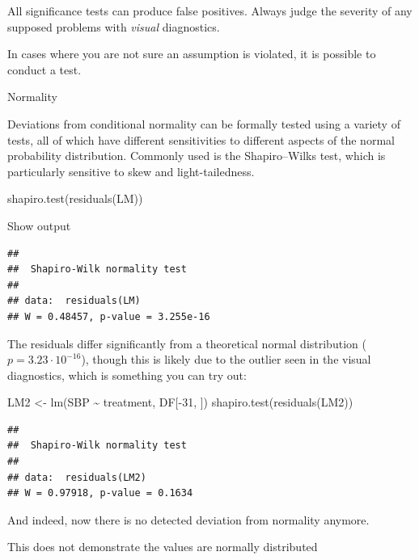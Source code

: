 \documentclass[
]{book}
\newenvironment{Shaded}{\begin{snugshade}}{\end{snugshade}}
\newcommand{\DecValTok}[1]{\textcolor[rgb]{0.00,0.00,0.81}{#1}}
\newcommand{\FunctionTok}[1]{\textcolor[rgb]{0.00,0.00,0.00}{#1}}
\newcommand{\NormalTok}[1]{#1}
\newcommand{\OtherTok}[1]{\textcolor[rgb]{0.56,0.35,0.01}{#1}}
\newcommand{\SpecialCharTok}[1]{\textcolor[rgb]{0.00,0.00,0.00}{#1}}
\begin{document}
All significance tests can produce false positives. Always judge the severity of any supposed problems with \emph{visual} diagnostics.

In cases where you are not sure an assumption is violated, it is possible to conduct a test.

Normality

Deviations from conditional normality can be formally tested using a variety of tests, all of which have different sensitivities to different aspects of the normal probability distribution. Commonly used is the Shapiro--Wilks test, which is particularly sensitive to skew and light-tailedness.\citep{ShapiroSensitivities}

\begin{Shaded}
\begin{Highlighting}[]
\FunctionTok{shapiro.test}\NormalTok{(}\FunctionTok{residuals}\NormalTok{(LM))}
\end{Highlighting}
\end{Shaded}

Show output

\begin{verbatim}
## 
##  Shapiro-Wilk normality test
## 
## data:  residuals(LM)
## W = 0.48457, p-value = 3.255e-16
\end{verbatim}

The residuals differ significantly from a theoretical normal distribution (\(p = 3.23 \cdot 10^{-16}\)), though this is likely due to the outlier seen in the visual diagnostics, which is something you can try out:

\begin{Shaded}
\begin{Highlighting}[]
\NormalTok{LM2 }\OtherTok{\textless{}{-}} \FunctionTok{lm}\NormalTok{(SBP }\SpecialCharTok{\textasciitilde{}}\NormalTok{ treatment, DF[}\SpecialCharTok{{-}}\DecValTok{31}\NormalTok{, ])}
\FunctionTok{shapiro.test}\NormalTok{(}\FunctionTok{residuals}\NormalTok{(LM2))}
\end{Highlighting}
\end{Shaded}

\begin{verbatim}
## 
##  Shapiro-Wilk normality test
## 
## data:  residuals(LM2)
## W = 0.97918, p-value = 0.1634
\end{verbatim}

And indeed, now there is no detected deviation from normality anymore.

This does not demonstrate the values are normally distributed
\end{document}
